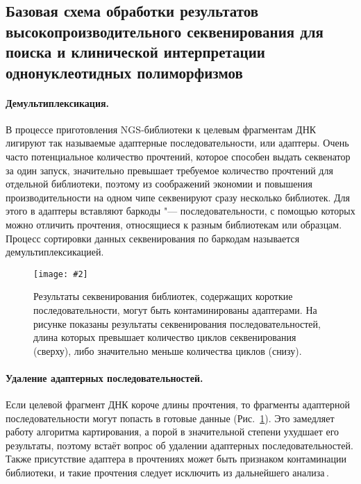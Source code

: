 \documentclass[a4paper,14pt]{extarticle}
\newcommand{\bigfiga}[5]{
\begin{figure}[#1]
\centering
\texttt{[image: \#2]}
\caption{\label{#3}#4}
\end{figure}
}
\newcommand{\ris}[1]{Рис.~\ref{#1}}
\begin{document}
\subsection{Базовая схема обработки результатов высокопроизводительного секвенирования для поиска и клинической интерпретации однонуклеотидных полиморфизмов}

\paragraph{Демультиплексикация.}
В процессе приготовления NGS\hyp{}библиотеки к целевым фрагментам ДНК лигируют так называемые адаптерные последовательности, или адаптеры.
Очень часто потенциальное количество прочтений, которое способен выдать секвенатор за один запуск, значительно превышает требуемое количество прочтений для отдельной библиотеки, поэтому из соображений экономии и повышения производительности на одном чипе секвенируют сразу несколько библиотек.
Для этого в адаптеры вставляют баркоды "--- последовательности, с помощью которых можно отличить прочтения, относящиеся к разным библиотекам или образцам.
Процесс сортировки данных секвенирования по баркодам называется демультиплексикацией.

\bigfiga{h}{Adapters.pdf}{fig:adapters}{Результаты секвенирования библиотек, содержащих короткие последовательности, могут быть контаминированы адаптерами. На рисунке показаны результаты секвенирования последовательностей, длина которых превышает количество циклов секвенирования (сверху), либо значительно меньше количества циклов (снизу).}{0.7}

\paragraph{Удаление адаптерных последовательностей.}
Если целевой фрагмент ДНК короче длины прочтения, то фрагменты адаптерной последовательности могут попасть в готовые данные (\ris{fig:adapters}).
Это замедляет работу алгоритма картирования, а порой в значительной степени ухудшает его результаты, поэтому встаёт вопрос об удалении адаптерных последовательностей.
Также присутствие адаптера в прочтениях может быть признаком контаминации библиотеки, и такие прочтения следует исключить из дальнейшего анализа\,\cite{Martin_2011}.
\end{document}
